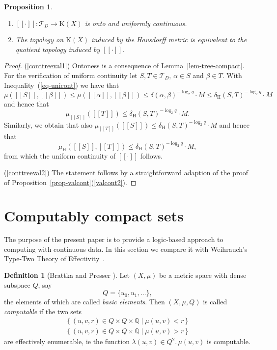 \documentclass[microtype]{jloganal}
\theoremstyle{plain}
\newtheorem{proposition}[theorem]{Proposition}
\theoremstyle{definition}
\newtheorem{definition}[theorem]{Definition}
\newcommand{\QQ}{\mathbb{Q}}
\newcommand{\TTT}{\mathcal{T}}
\newcommand{\compact}{\mathrm{K}}
\newcommand{\hdm}{\mu_{\mathrm H}}
\newcommand{\treehdm}{\delta_{\mathrm H}}
\newcommand{\val}[1]{[\![#1]\!]}
\newcommand{\set}[2]{\mbox{$\{\,#1 \mid #2 \,\}$}}
\newcommand{\fun}[3]{\mbox{$#1 \colon #2 \rightarrow #3$}}
\begin{document}
\begin{proposition}\label{prop-conttreeval}
\begin{enumerate}
\item\label{conttreeval1}
$\fun{\val{\cdot}}{\TTT_D}{\compact(X)}$ is onto and uniformly 
continuous.
\item\label{conttreeval2}
The topology on $\compact(X)$ induced by the Hausdorff metric is equivalent 
to the quotient topology induced by $\val{\cdot}$.
\end{enumerate}
\end{proposition}
\begin{proof}
(\ref{conttreeval1}) Ontoness is a consequence of Lemma~\ref{lem-tree-compact}. For the verification of uniform continuity let $S, T \in \TTT_D$, $\alpha \in S$ and $\beta \in T$. With Inequality~(\ref{eq-unicont}) we have that
\[
\mu(\val{S}, \val{\beta}) \le \mu(\val{\alpha}, \val{\beta}) \le \delta(\alpha, \beta)^{- \log_2 q} \cdot M \le \treehdm(S,T)^{-\log_2 q} \cdot M
\]
and hence that
\[
\mu_{\val{S}}(\val{T}) \le \treehdm(S,T)^{-\log_2q} \cdot M.
\]
Similarly, we obtain that also $\mu_{\val{T}}(\val{S}) \le \treehdm(S,T)^{-\log_2q} \cdot M$ and hence that $$\hdm(\val{S}, \val{T}) \le \treehdm(S,T)^{-\log_2q} \cdot M,$$ from which the uniform continuity of $\val{\cdot}$ follows.

(\ref{conttreeval2}) The statement follows by a straightforward adaption
of the proof of Proposition~\ref{prop-valcont}(\ref{valcont2}).
\end{proof}


\section{Computably compact sets}
\label{sec-computable}

The purpose of the present paper is to provide a logic-based approach to 
computing with continuous data. In this section we compare it with 
Weihrauch's Type-Two Theory of Effectivity~\cite{Weihrauch00}.

\begin{definition}[{\rm Brattka and Presser \cite{BrattkaPresser03}}]
\label{met-computable}
Let $(X, \mu)$ be a metric space with dense subspace $Q$, say
\[
Q = \{ u_0, u_1, \ldots \},
\]
the elements of which are called \emph{basic elements}.
Then $(X, \mu, Q)$ is called \emph{computable} if the two sets
\begin{gather*}
\set{(u, v, r) \in Q \times Q \times \QQ}{\mu(u, v) < r} \\
\set{(u, v, r) \in Q \times Q \times \QQ}{\mu(u, v) > r}
\end{gather*}
are effectively enumerable, ie the function $\lambda (u,v) \in Q^2.\, \mu(u, v)$ is computable.
\end{definition}
\end{document}
